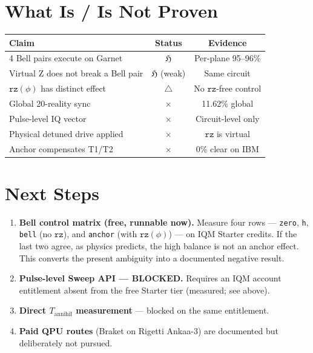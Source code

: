 \documentclass[11pt,a4paper]{article}
\begin{document}
\section{What Is / Is Not Proven}

\begin{table}[h]
\centering
\begin{tabular}{lcc}
\toprule
Claim & Status & Evidence \\
\midrule
4 Bell pairs execute on Garnet & $\mathfrak{H}$ & Per-plane 95--96\% \\
Virtual Z does not break a Bell pair & $\mathfrak{H}$ (weak) & Same circuit \\
$\texttt{rz}(\phi)$ has distinct effect & $\triangle$ & No $\texttt{rz}$-free control \\
Global 20-reality sync & $\times$ & 11.62\% global \\
Pulse-level IQ vector & $\times$ & Circuit-level only \\
Physical detuned drive applied & $\times$ & $\texttt{rz}$ is virtual \\
Anchor compensates T1/T2 & $\times$ & 0\% clear on IBM \\
\bottomrule
\end{tabular}
\end{table}

\section{Next Steps}

\begin{enumerate}
\item \textbf{Bell control matrix (free, runnable now).} Measure four rows
      --- \texttt{zero}, \texttt{h}, \texttt{bell} (no $\texttt{rz}$), and
      \texttt{anchor} (with $\texttt{rz}(\phi)$) --- on IQM Starter credits.
      If the last two agree, as physics predicts, the high balance is not an
      anchor effect. This converts the present ambiguity into a documented
      negative result.
\item \textbf{Pulse-level Sweep API --- BLOCKED.} Requires an IQM account
      entitlement absent from the free Starter tier (measured; see above).
\item \textbf{Direct $T_{\text{annihil}}$ measurement} --- blocked on the same
      entitlement.
\item \textbf{Paid QPU routes} (Braket on Rigetti Ankaa-3) are documented but
      deliberately not pursued.
\end{enumerate}
\end{document}
